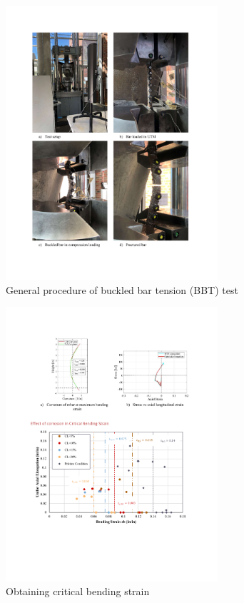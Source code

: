 \begin{figure}[htbp]
	\centering
	\includegraphics[width=0.7\textwidth]{VAC Thesis 2.0/Chapter-4/figs/BBT Procedure.pdf}
	\caption{General procedure of buckled bar tension (BBT) test}
	\label{fig:BBT_Test_Summary}
\end{figure}

\begin{figure}[htbp]
	\centering
	\includegraphics[width=0.7\textwidth]{VAC Thesis 2.0/Chapter-4/figs/BBT_curvature}
	\caption{Obtaining critical bending strain}
	\label{fig:bendingstrain}
\end{figure}

